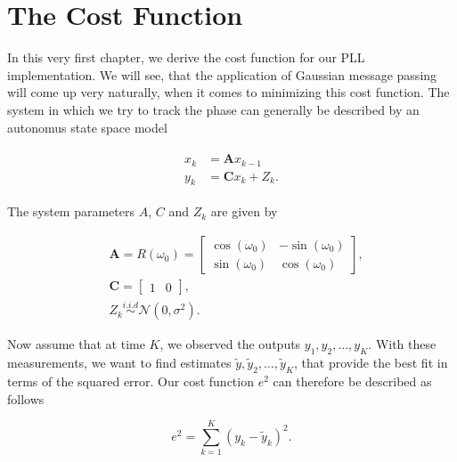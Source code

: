 \documentclass[11pt,a4paper,twoside]{report}
\newcommand{\mat}[1]{\mathbf{#1}}
\begin{document}
\tableofcontents
\setcounter{secnumdepth}{-1}	%

\newpage
\pagestyle{plain}

\chapter{The Cost Function}

In this very first chapter, we derive the cost function for our PLL implementation. We will see, that the application of Gaussian message passing will come up very naturally, when it comes to minimizing this cost function. The system in which we try to track the phase can generally be described by an autonomus state space model

\begin{align}
\label{eq: state space model}
\begin{split}
	x_k &= \mat{A} x_{k-1}
	\\
	y_k &= \mat{C} x_k + Z_k.
\end{split}
\end{align}

\noindent The system parameters $A$, $C$ and $Z_k$ are given by

\begin{align*}
	&\mat{A} = R(\omega_0) = 
		\begin{bmatrix}
			\cos(\omega_0) & -\sin(\omega_0) \\
			\sin(\omega_0) & \cos(\omega_0)
		\end{bmatrix},
	\\
	&\mat{C} = 
		\begin{bmatrix}
			1 & 0
		\end{bmatrix},
	\\
	&Z_k \overset{i.i.d}{\sim} \mathcal{N}\left(0, \sigma^2\right).
\end{align*}

Now assume that at time $K$, we observed the outputs $y_1, y_2, \ldots, y_K$. With these measurements, we want to find estimates $\tilde{y}, \tilde{y}_2, \ldots, \tilde{y}_K$, that provide the best fit in terms of the squared error. Our cost function $e^2$ can therefore be described as follows

\begin{equation}
	\label{eq: cost function}
	e^2 = \sum_{k=1}^K \left(y_k - \tilde{y}_k\right)^2.
\end{equation}
\end{document}

